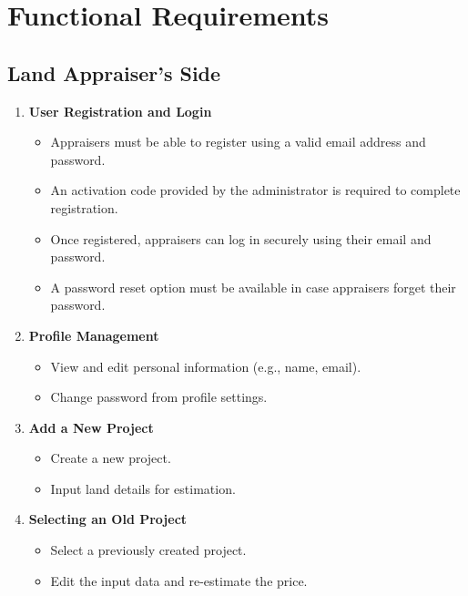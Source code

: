 \documentclass[12pt,oneside]{report}
\begin{document}
\section{Functional Requirements}

\subsection{Land Appraiser's Side}
\begin{enumerate}[leftmargin=*,label=\arabic*.,align=left]
  \item \textbf{User Registration and Login}
  \begin{itemize}[leftmargin=1.2em]
    \item Appraisers must be able to register using a valid email address and password.
    \item An activation code provided by the administrator is required to complete registration.
    \item Once registered, appraisers can log in securely using their email and password.
    \item A password reset option must be available in case appraisers forget their password.
  \end{itemize}

  \item \textbf{Profile Management}
  \begin{itemize}[leftmargin=1.2em]
    \item View and edit personal information (e.g., name, email).
    \item Change password from profile settings.
  \end{itemize}

  \item \textbf{Add a New Project}
  \begin{itemize}[leftmargin=1.2em]
    \item Create a new project.
    \item Input land details for estimation.
  \end{itemize}

  \item \textbf{Selecting an Old Project}
  \begin{itemize}[leftmargin=1.2em]
    \item Select a previously created project.
    \item Edit the input data and re-estimate the price.
  \end{itemize}


\end{enumerate}
\end{document}
